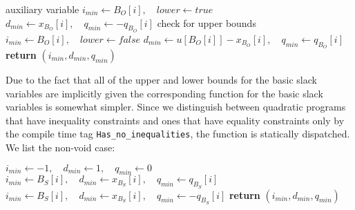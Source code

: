 \documentclass[a4paper]{article}
\begin{document}
\begin{algorithmic}
                    \EndIf
                \EndIf
            \Else
                \Comment auxiliary variable
                    \State $i_{min} \gets B_{O}[i], \quad lower \gets true$
                    \State $d_{min} \gets x_{B_{O}}[i],
                        \quad q_{min} \gets -q_{B_{O}}[i]$
                \EndIf
            \EndIf
            \Comment check for upper bounds
                    \State $i_{min} \gets B_{O}[i], \quad lower \gets false$
                    \State $d_{min} \gets u[B_{O}[i]]-x_{B_{O}}[i],
                        \quad q_{min} \gets q_{B_{O}}[i]$
                \EndIf
            \EndIf
        \EndIf
    \EndFor
\EndIf
\State \textbf{return} $(i_{min}, d_{min}, q_{min})$
\EndFunction
\end{algorithmic}
Due to the fact that all of the upper and lower bounds for the basic slack
variables are implicitly given the corresponding function for the basic slack
variables is somewhat simpler. Since we distinguish between quadratic programs
that have inequality constraints and ones that have equality constraints only
by the compile time tag \texttt{Has\_no\_inequalities}, the function
is statically dispatched. We list the non-void case:
\begin{algorithmic}
\State $i_{min} \gets -1, \quad     d_{min} \gets 1, \quad  q_{min} \gets 0$
                \State $i_{min} \gets B_{S}[i],
                    \quad d_{min} \gets x_{B_{S}}[i],
                    \quad q_{min} \gets q_{B_{S}}[i]$
            \EndIf	
        \EndIf 
    \EndFor
\Else
                \State $i_{min} \gets B_{S}[i],
                    \quad d_{min} \gets x_{B_{S}}[i],
                    \quad q_{min} \gets -q_{B_{S}}[i]$
            \EndIf	
        \EndIf 
    \EndFor
\EndIf
\State \textbf{return} $(i_{min}, d_{min}, q_{min})$
\EndFunction
\end{algorithmic}
\end{document}
